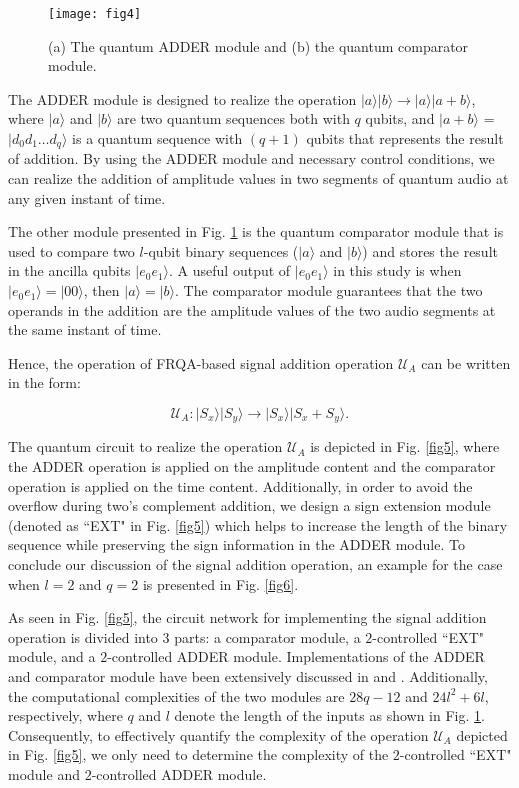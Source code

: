 \documentclass[10pt,journal,compsoc]{IEEEtran}
\begin{document}
\begin{figure}[!t]
\centering
\texttt{[image: fig4]}
\caption{(a) The quantum ADDER module and (b) the quantum comparator module.}
\label{fig4}
\end{figure}

The ADDER module \cite{13} is designed to realize the operation $\vert a \rangle\vert b \rangle \rightarrow \vert a \rangle\vert a + b \rangle$, where $\vert a \rangle$ and $\vert b \rangle$ are two quantum sequences both with $q$ qubits, and $\vert a + b \rangle$ = $\vert d_0d_1\ldots d_{q} \rangle$ is a quantum sequence with $(q + 1)$ qubits that represents the result of addition. By using the ADDER module and necessary control conditions, we can realize the addition of amplitude values in two segments of quantum audio at any given instant of time.

The other module presented in Fig. \ref{fig4} is the quantum comparator module \cite{15} that is used to compare two $l$-qubit binary sequences ($\vert a\rangle$ and $\vert b\rangle$) and stores the result in the ancilla qubits $\vert e_0e_1 \rangle$. A useful output of $\vert e_0e_1 \rangle$ in this study is when $\vert e_0e_1 \rangle = \vert 00 \rangle$, then $\vert a\rangle = \vert b\rangle$. The comparator module guarantees that the two operands in the addition are the amplitude values of the two audio segments at the same instant of time.

Hence, the operation of FRQA-based signal addition operation $\mathcal{U}_A$ can be written in the form:

\begin{equation}\label{eq22}
\mathcal{U}_A : \vert S_x \rangle\vert S_y \rangle \rightarrow \vert S_x \rangle\vert S_x + S_y \rangle.
\end{equation}

The quantum circuit to realize the operation $\mathcal{U}_A$ is depicted in Fig. \ref{fig5}, where the ADDER operation is applied on the amplitude content and the comparator operation is applied on the time content. Additionally, in order to avoid the overflow during two's complement addition, we design a sign extension module (denoted as ``EXT" in Fig. \ref{fig5}) which helps to increase the length of the binary sequence while preserving the sign information in the ADDER module. To conclude our discussion of the signal addition operation, an example for the case when $l = 2$ and $q = 2$ is presented in Fig. \ref{fig6}.

As seen in Fig. \ref{fig5}, the circuit network for implementing the signal addition operation is divided into 3 parts: a comparator module, a $2$-controlled ``EXT" module, and a $2$-controlled ADDER module. Implementations of the ADDER and comparator module have been extensively discussed in \cite{15} and \cite{16}. Additionally, the computational complexities of the two modules are $28q - 12$ and $24l^2 + 6l$, respectively, where $q$ and $l$ denote the length of the inputs as shown in Fig. \ref{fig4}. Consequently, to effectively quantify the complexity of the operation $\mathcal{U}_A$ depicted in Fig. \ref{fig5}, we only need to determine the complexity of the $2$-controlled ``EXT" module and $2$-controlled ADDER module.
\end{document}
